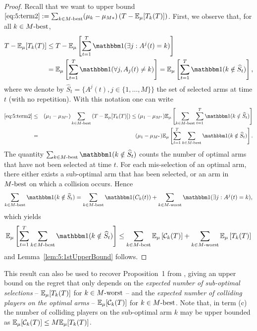 \begin{proof}
  Recall that we want to upper bound
  $ \ref{eq:5:term2} : = \sum_{k \in M\text{-}\mathrm{best}} (\mu_k - \mu_{M*}) \left(T - \mathbb{E}_{\mu}[T_k(T)]\right)$.
  First, we observe that, for all $k\in M\text{-}\mathrm{best}$,
  \begin{eqnarray*}
    T - \E_{\mu}[T_k(T)] & \leq T - \E_{\mu}\left[\sum_{t=1}^T \indic(\exists j : A^j(t) = k)\right] \\
    & = \E_{\mu}\left[\sum_{t=1}^T \indic(\forall j, A_j(t) \neq k)\right] = \E_{\mu}\left[\sum_{t=1}^T \indic(k \notin \widehat{S}_t)\right],
  \end{eqnarray*}
  where we denote by $\widehat{S}_t = \{A^j(t), j \in \{1,\dots,M\}\}$ the set of selected arms at time $t$ (with no repetition). With this notation one can write
  \begin{eqnarray*}
  \ref{eq:5:term2} & \leq & (\mu_1 - \mu_{M^*})  \sum_{k \in \Mbest} \left(T - \E_{\mu}[T_k(T)]\right) \leq  (\mu_1 - \mu_{M^*})  \E_{\mu}\left[\sum_{k \in \Mbest} \sum_{t = 1}^T \indic(k \notin \widehat{S}_t)\right] \\
  & = &  (\mu_1 - \mu_{M^*})  \E_{\mu}\left[ \sum_{t = 1}^T \sum_{k \in \Mbest}\indic(k \notin \widehat{S}_t)\right].
  \end{eqnarray*}
  The quantity $\sum_{k \in \Mbest}\indic(k \notin \widehat{S}_t)$ counts the number of optimal arms that have not been selected at time $t$. For each mis-selection of an optimal arm, there either exists a sub-optimal arm that has been selected, or an arm in $M\text{-}\mathrm{best}$ on which a collision occurs. Hence
  \[\sum_{k \in \Mbest}\indic(k \notin \widehat{S}_t) = \sum_{k \in \Mbest}\indic(C_k(t)) + \sum_{k \in \Mworst} \indic(\exists j : A^j(t) = k),\]
  which yields
  \[\E_{\mu}\left[ \sum_{t = 1}^T \sum_{k \in \Mbest}\indic(k \notin \widehat{S}_t)\right] \leq \sum_{k \in \Mbest}\E_{\mu}\left[\cC_k(T)\right] + \sum_{k \in \Mworst} \E_{\mu}\left[T_k(T)\right]\]
  and Lemma~\ref{lem:5:1stUpperBound} follows.
\end{proof}


This result can also be used to recover Proposition~1 from \cite{Anandkumar11}, giving an upper bound on the regret that only depends on
the \emph{expected number of sub-optimal selections} -- $\mathbb{E}_{\mu}[T_k(T)]$ for $k \in M\text{-}\mathrm{worst}$ --
and the \emph{expected number of colliding players on the optimal arms} -- $\mathbb{E}_{\mu}[\mathcal{C}_k(T)]$ for $k \in M\text{-}\mathrm{best}$. Note that, in term (c) the number of colliding players on the sub-optimal arm $k$ may be upper bounded as $\mathbb{E}_{\mu}[\mathcal{C}_k(T)] \leq M \mathbb{E}_{\mu}[T_k(T)]$.
%

